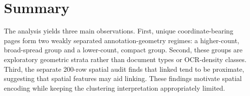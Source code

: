 \section{Summary}
\label{sec:dataset_summary}

The analysis yields three main observations. First, unique coordinate-bearing pages form two weakly separated annotation-geometry regimes: a higher-count, broad-spread group and a lower-count, compact group. Second, these groups are exploratory geometric strata rather than document types or OCR-density classes. Third, the separate 200-row spatial audit finds that linked \kvps{} tend to be proximate, suggesting that spatial features may aid linking. These findings motivate spatial encoding while keeping the clustering interpretation appropriately limited.
